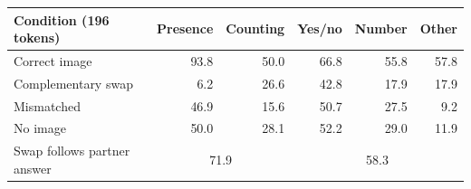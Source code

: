 \begin{tabular}{lrrrrr}
\toprule
Condition (196 tokens) & Presence & Counting & Yes/no & Number & Other \\
\midrule
Correct image & 93.8 & 50.0 & 66.8 & 55.8 & 57.8 \\
Complementary swap & 6.2 & 26.6 & 42.8 & 17.9 & 17.9 \\
Mismatched & 46.9 & 15.6 & 50.7 & 27.5 & 9.2 \\
No image & 50.0 & 28.1 & 52.2 & 29.0 & 11.9 \\
\midrule
Swap follows partner answer & \multicolumn{2}{c}{71.9} & \multicolumn{3}{c}{58.3} \\
\bottomrule
\end{tabular}
